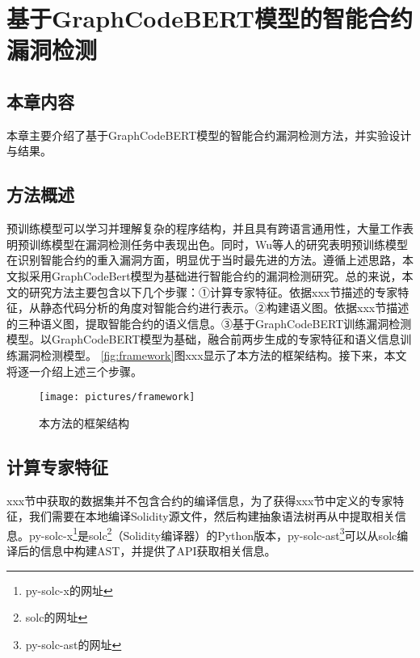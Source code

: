 \chapter{基于GraphCodeBERT模型的智能合约漏洞检测}
\section{本章内容}
本章主要介绍了基于GraphCodeBERT模型的智能合约漏洞检测方法，并实验设计与结果。
\section{方法概述}
预训练模型可以学习并理解复杂的程序结构，并且具有跨语言通用性，大量工作表明预训练模型在漏洞检测任务中表现出色\cite{pretrained_is_good_1,pretrained_is_good_2,pretrained_is_good_3}。同时，Wu等人的研究表明预训练模型在识别智能合约的重入漏洞方面，明显优于当时最先进的方法\cite{wu2021peculiar}。遵循上述思路，本文拟采用GraphCodeBert模型为基础进行智能合约的漏洞检测研究。总的来说，本文的研究方法主要包含以下几个步骤：①计算专家特征。依据xxx节描述的专家特征，从静态代码分析的角度对智能合约进行表示。②构建语义图。依据xxx节描述的三种语义图，提取智能合约的语义信息。③基于GraphCodeBERT训练漏洞检测模型。以GraphCodeBERT模型为基础，融合前两步生成的专家特征和语义信息训练漏洞检测模型。
\autoref{fig:framework}图xxx显示了本方法的框架结构。接下来，本文将逐一介绍上述三个步骤。
\begin{figure}[htbp]
    \centering
    \texttt{[image: pictures/framework]}
    \caption{\label{fig:framework}本方法的框架结构}
\end{figure}

\section{计算专家特征}
xxx节中获取的数据集并不包含合约的编译信息，为了获得xxx节中定义的专家特征，我们需要在本地编译Solidity源文件，然后构建抽象语法树再从中提取相关信息。py-solc-x\footnote{py-solc-x的网址}是solc\footnote{solc的网址}（Solidity编译器）的Python版本，py-solc-ast\footnote{py-solc-ast的网址}可以从solc编译后的信息中构建AST，并提供了API获取相关信息。

